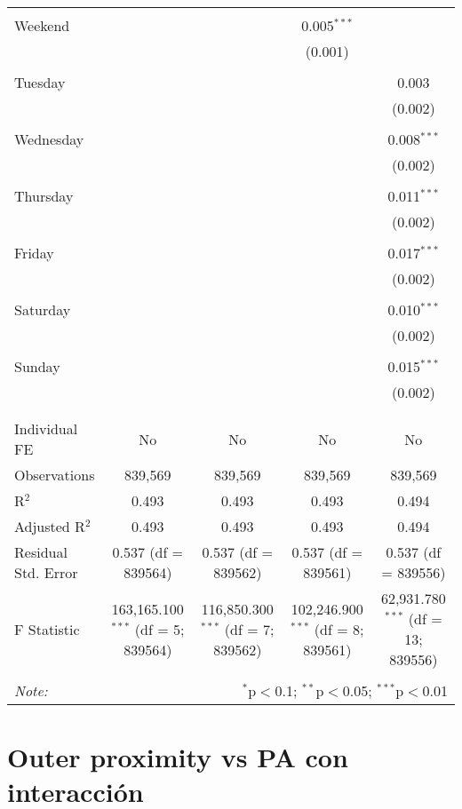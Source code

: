 \documentclass[
]{article}
\begin{document}
\begin{table}[!htbp]
{\begin{tabular}{@{\extracolsep{5pt}}lcccc}
  & & & & \\ 
 Weekend &  &  & 0.005$^{***}$ &  \\ 
  &  &  & (0.001) &  \\ 
  & & & & \\ 
 Tuesday &  &  &  & 0.003 \\ 
  &  &  &  & (0.002) \\ 
  & & & & \\ 
 Wednesday &  &  &  & 0.008$^{***}$ \\ 
  &  &  &  & (0.002) \\ 
  & & & & \\ 
 Thursday &  &  &  & 0.011$^{***}$ \\ 
  &  &  &  & (0.002) \\ 
  & & & & \\ 
 Friday &  &  &  & 0.017$^{***}$ \\ 
  &  &  &  & (0.002) \\ 
  & & & & \\ 
 Saturday &  &  &  & 0.010$^{***}$ \\ 
  &  &  &  & (0.002) \\ 
  & & & & \\ 
 Sunday &  &  &  & 0.015$^{***}$ \\ 
  &  &  &  & (0.002) \\ 
  & & & & \\ 
\hline \\[-1.8ex] 
Individual FE & No & No & No & No \\ 
Observations & 839,569 & 839,569 & 839,569 & 839,569 \\ 
R$^{2}$ & 0.493 & 0.493 & 0.493 & 0.494 \\ 
Adjusted R$^{2}$ & 0.493 & 0.493 & 0.493 & 0.494 \\ 
Residual Std. Error & 0.537 (df = 839564) & 0.537 (df = 839562) & 0.537 (df = 839561) & 0.537 (df = 839556) \\ 
F Statistic & 163,165.100$^{***}$ (df = 5; 839564) & 116,850.300$^{***}$ (df = 7; 839562) & 102,246.900$^{***}$ (df = 8; 839561) & 62,931.780$^{***}$ (df = 13; 839556) \\ 
\hline 
\hline \\[-1.8ex] 
\textit{Note:}  & \multicolumn{4}{r}{$^{*}$p$<$0.1; $^{**}$p$<$0.05; $^{***}$p$<$0.01} \\ 
\end{tabular}
} 
\end{table} 
\newpage
\section{Outer proximity vs PA con interacción}
\end{document}
